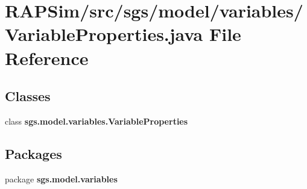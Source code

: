 \section{R\-A\-P\-Sim/src/sgs/model/variables/\-Variable\-Properties.java File Reference}
\label{_variable_properties_8java}
\subsection*{Classes}
\begin{DoxyCompactItemize}
\item 
class {\bf sgs.\-model.\-variables.\-Variable\-Properties}
\end{DoxyCompactItemize}
\subsection*{Packages}
\begin{DoxyCompactItemize}
\item 
package {\bf sgs.\-model.\-variables}
\end{DoxyCompactItemize}
